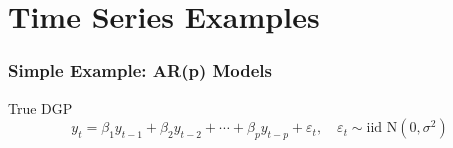 \section{Time Series Examples}
\begin{frame}
  \frametitle{Simple Example: AR(p) Models}

  \begin{block}{True DGP}
  \[
    y_t = \beta_1 y_{t-1} + \beta_2 y_{t-2} + \cdots + \beta_p y_{t-p} + \varepsilon_t, \quad \varepsilon_t \sim \text{iid N}(0,\sigma^2) 
  \]
\end{block}

\end{frame}
